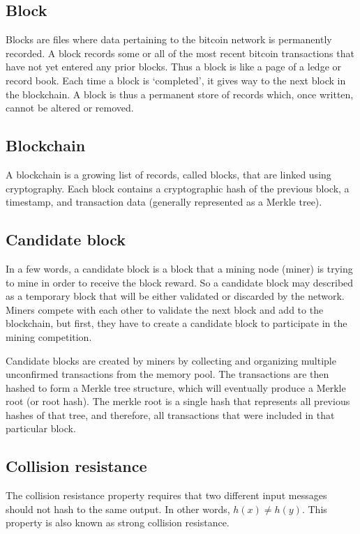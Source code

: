 \documentclass{article}
\begin{document}
\subsection{Block}
Blocks are files where data pertaining to the bitcoin network is permanently
recorded. A block records some or all of the most recent bitcoin transactions
that have not yet entered any prior blocks. Thus a block is like a page of a
ledge or record book. Each time a block is `completed', it gives way to the
next block in the blockchain. A block is thus a permanent store of records
which, once written, cannot be altered or removed.

\subsection{Blockchain}
A blockchain is a growing list of records, called blocks, that are linked using
cryptography. Each block contains a cryptographic hash of the previous block,
a timestamp, and transaction data (generally represented as a Merkle tree).

\subsection{Candidate block}
In a few words, a candidate block is a block that a mining node (miner) is
trying to mine in order to receive the block reward. So a candidate block may
described as a temporary block that will be either validated or discarded by
the network. Miners compete with each other to validate the next block and add
to the blockchain, but first, they have to create a candidate block to
participate in the mining competition.

Candidate blocks are created by miners by collecting and organizing multiple
unconfirmed transactions from the memory pool. The transactions are then hashed
to form a Merkle tree structure, which will eventually produce a Merkle root
(or root hash). The merkle root is a single hash that represents all previous
hashes of that tree, and therefore, all transactions that were included in
that particular block.

\subsection{Collision resistance}
The collision resistance property requires that two different input messages
should not hash to the same output. In other words, $h(x) \not= h(y)$. This
property is also known as strong collision resistance.
\end{document}
